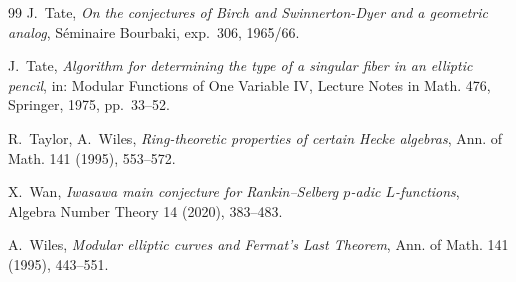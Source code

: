 \documentclass[11pt]{article}
\begin{document}
\begin{thebibliography}{99}
J.~Tate,
\textit{On the conjectures of Birch and Swinnerton-Dyer and a geometric
analog},
S\'eminaire Bourbaki, exp.~306, 1965/66.

J.~Tate,
\textit{Algorithm for determining the type of a singular fiber in an
elliptic pencil},
in: Modular Functions of One Variable IV, Lecture Notes in Math. 476,
Springer, 1975, pp.~33--52.

R.~Taylor, A.~Wiles,
\textit{Ring-theoretic properties of certain Hecke algebras},
Ann. of Math. 141 (1995), 553--572.

X.~Wan,
\textit{Iwasawa main conjecture for Rankin--Selberg $p$-adic
$L$-functions},
Algebra Number Theory 14 (2020), 383--483.

A.~Wiles,
\textit{Modular elliptic curves and Fermat's Last Theorem},
Ann. of Math. 141 (1995), 443--551.

\end{thebibliography}
\end{document}
